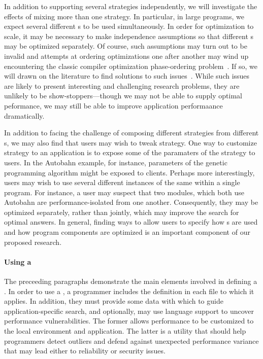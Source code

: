 In addition to supporting several strategies independently, we will
investigate the effects of mixing more than one strategy.  In particular,
in large programs, we expect several different \rasp{}s to be used simultaneously.
In order for optimization to scale, it may be necessary to make independence assumptions
so that different \rasp{}s may be optimized separately.  Of course, such assumptions
may turn out to be invalid and attempts at ordering optimizations one after another
may wind up encountering the classic compiler optimization phase-ordering
problem~\cite{Click:combining-optimizations,Vegdahl:phase-coupling}.
 If so, we will drawn on the literature
to find solutions to such issues~\cite{Kulkarni:phase-ordering-search,Kulkarni:phase-ordering}.  While such issues are likely to present interesting
and challenging research problems, they are unlikely to be show-stoppers---though we may not
be able to supply optimal peformance, we may still be able to improve application performaance
dramatically.

In addition to facing the challenge of composing different strategies from different \rasp{}s,
we may also find that users may wish to tweak \rasp{} strategy.  One way to customize \rasp{}
strategy to an application is to expose some of the paramaters of the \rasp{} strategy to users.
In the Autobahn example, for instance, parameters of the genetic programming algorithm might
be exposed to clients.  Perhaps more interestingly, users may wish to use several different
instances of the same \rasp{} within a single program.  For instance, a user may suspect that
two modules, which both use Autobahn are performance-isolated from one another.  Consequently,
they may be optimized separately, rather than jointly, which may improve the search for
optimal answers.  In general, finding ways to allow users to specify how \rasp{}s are used and how program
components are optimized is an important component of our proposed research.

\paragraph*{Using a \rasp{}}
The preceeding paragraphs demonstrate the main elements involved in
defining a \rasp.  In order to use a \rasp, a programmer includes
the \rasp{} definition in each file to which it applies.  In addition, they
must provide some data with which to guide application-specific search,
and optionally, may use language support to uncover performance vulnerabilities.
The former allows performance to be customized to the local environment and application.
The latter is a utility that should help programmers detect outliers and defend against
unexpected performance variance that may lead either to reliability or security issues.

